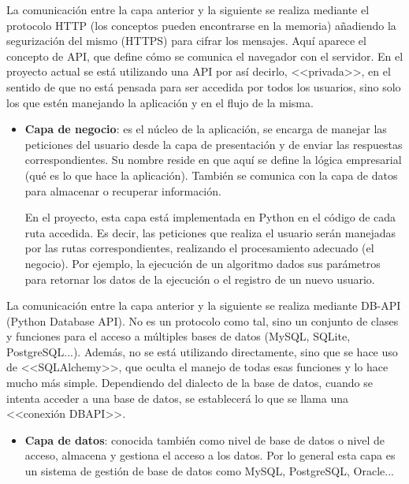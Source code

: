 La comunicación entre la capa anterior y la siguiente se realiza mediante el
protocolo HTTP (los conceptos pueden encontrarse en la memoria) añadiendo la
segurización del mismo (HTTPS) para cifrar los mensajes. Aquí aparece el
concepto de API, que define cómo se comunica el navegador con el servidor. En el
proyecto actual se está utilizando una API por así decirlo, <<privada>>, en el
sentido de que no está pensada para ser accedida por todos los usuarios, sino
solo los que estén manejando la aplicación y en el flujo de la misma. 

\begin{itemize}
    \item \textbf{Capa de negocio}: es el núcleo de la aplicación, se encarga de
    manejar las peticiones del usuario desde la capa de presentación y de enviar
    las respuestas correspondientes. Su nombre reside en que aquí se define la
    lógica empresarial (qué es lo que hace la aplicación). También se comunica
    con la capa de datos para almacenar o recuperar información.

    En el proyecto, esta capa está implementada en Python en el código de cada
    ruta accedida. Es decir, las peticiones que realiza el usuario serán
    manejadas por las rutas correspondientes, realizando el procesamiento
    adecuado (el negocio). Por ejemplo, la ejecución de un algoritmo dados sus
    parámetros para retornar los datos de la ejecución o el registro de un nuevo
    usuario.
\end{itemize}

La comunicación entre la capa anterior y la siguiente se realiza mediante DB-API
(Python Database API). No es un protocolo como tal, sino un conjunto de clases y
funciones para el acceso a múltiples bases de datos (MySQL, SQLite,
PostgreSQL...). Además, no se está utilizando directamente, sino que se hace uso
de <<SQLAlchemy>>, que oculta el manejo de todas esas funciones y lo hace mucho
más simple. Dependiendo del dialecto de la base de datos, cuando se intenta
acceder a una base de datos, se establecerá lo que se llama una <<conexión
DBAPI>>.

\begin{itemize}
    \item \textbf{Capa de datos}: conocida también como nivel de base de datos o
    nivel de acceso, almacena y gestiona el acceso a los datos. Por lo general
    esta capa es un sistema de gestión de base de datos como MySQL, PostgreSQL,
    Oracle...
\end{itemize}


